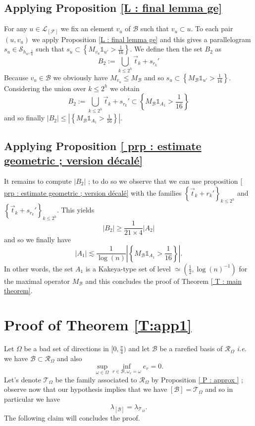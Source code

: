 \documentclass{article}
\begin{document}
\subsection*{Applying Proposition \ref{L : final lemma ge}}

For any $u \in \mathcal{L}_{[\mathcal{F}]}$ we fix an element $v_u$ of $\mathcal{B}$ such that $v_u \subset u$. To each pair $(u,v_u)$ we apply Proposition \ref{L : final lemma ge} and this gives a parallelogram $s_u \in \mathcal{S}_{h_u,\frac{1}{4}}$ such that $s_u \subset \left\{ M_{v_u}\mathbb{1}_{u'} > \frac{1}{16} \right\}$. We define then the set $B_2$ as $$B_2 := \bigcup_{ k \leq 2^h}  \Vec{t}_k + s_{r_k}' $$ Because $v_u \in \mathcal{B}$ we obviously have $M_{v_u} \leq M_\mathcal{B}$ and so  $s_u \subset \left\{ M_{\mathcal{B}}\mathbb{1}_{u'} > \frac{1}{16} \right\}$. Considering the union over $k \leq 2^h$ we obtain $$B_2 := \bigcup_{k \leq 2^h} \Vec{t}_k + s_{r_k}' \subset \left\{ M_{\mathcal{B}}\mathbb{1}_{A_1} > \frac{1}{16} \right\}$$ and so finally $|B_2| \leq \left|\left\{ M_{\mathcal{B}}\mathbb{1}_{A_1} > \frac{1}{16} \right\}\right|$.

\subsection*{Applying Proposition \ref{ prp : estimate geometric ; version décalé}}

It remains to compute $|B_2|$ ; to do so we observe that we can use proposition \ref{ prp : estimate geometric ; version décalé} with the families $\left\{ \Vec{t}_k + r_k' \right\}_{k \leq 2^h}$ and $\left\{  \Vec{t}_k + s_{r_k}' \right\}_{k \leq 2^h}$. This yields $$|B_2| \geq \frac{1}{21 \times 4}|A_2|$$ and so we finally have $$|A_1| \lesssim \frac{1}{\log(n)}\left| \left\{ M_{\mathcal{B}}\mathbb{1}_{A_1} > \frac{1}{16} \right\}\right|.$$ In other words, the set $A_1$ is a Kakeya-type set of level $\simeq (\frac{1}{2}, \log(n)^{-1})$ for the maximal operator $M_\mathcal{B}$ and this concludes the proof of Theorem \ref{ T : main theorem}.





\section{Proof of Theorem \ref{T:app1}}

Let $\Omega$ be a bad set of directions in $[0,\frac{\pi}{4})$ and let $\mathcal{B}$ be a rarefied basis of $\mathcal{R}_\Omega$ \textit{i.e.} we have $\mathcal{B} \subset \mathcal{R}_\Omega$ and also $$\sup_{ \omega \in \Omega} \inf_{ r \in \mathcal{B}, \omega_r = \omega} e_r  = 0.$$ Let's denote $\mathcal{T}_\Omega$ be the family associated to $\mathcal{R}_\Omega$ by Proposition \ref{ P : approx } ; observe now that our hypothesis implies that we have $[\mathcal{B}] = \mathcal{T}_\Omega$ and so in particular we have $$ \lambda_{[\mathcal{B}]} = \lambda_{ \mathcal{T}_\Omega}.$$ The following claim will concludes the proof.
\end{document}
